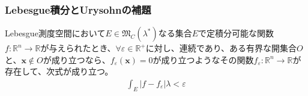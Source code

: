 \documentclass[dvipdfmx]{jsarticle}
\begin{document}
\subsubsection{Lebesgue積分とUrysohnの補題}%
\begin{thm}\label{4.6.6.2}
Lebesgue測度空間において$E \in \mathfrak{M}_{C}\left( \lambda^{*} \right)$なる集合$E$で定積分可能な関数$f:\mathbb{R}^{n} \rightarrow \mathbb{R}$が与えられたとき、$\forall\varepsilon \in \mathbb{R}^{+}$に対し、連続であり、ある有界な開集合$O$と、$\mathbf{x} \notin O$が成り立つなら、$f_{\varepsilon}\left( \mathbf{x} \right) = 0$が成り立つようなその関数$f_{\varepsilon}:\mathbb{R}^{n} \rightarrow \mathbb{R}$が存在して、次式が成り立つ。
\begin{align*}
\int_{E} {\left| f - f_{\varepsilon} \right|\lambda} < \varepsilon
\end{align*}
\end{thm}
\end{document}
